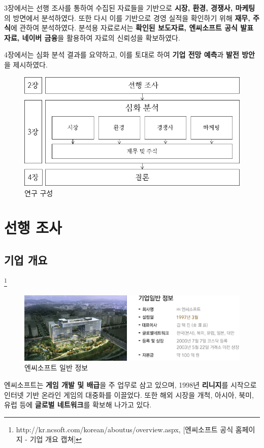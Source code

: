 \documentclass[11pt]{oblivoir}
\begin{document}
			3장에서는 선행 조사를 통하여 수집된 자료들을 기반으로 \textbf{시장, 환경, 경쟁사, 마케팅}의 방면에서 분석하였다. 또한 다시 이를 기반으로 경영 실적을 확인하기 위해 \textbf{재무, 주식}에 관하여 분석하였다. 분석용 자료로서는 \textbf{확인된 보도자료, 엔씨소프트 공식 발표 자료, 네이버 금융}을 활용하여 자료의 신뢰성을 확보하였다.
			
			4장에서는 심화 분석 결과를 요약하고, 이를 토대로 하여 \textbf{기업 전망 예측}과 \textbf{발전 방안}을 제시하였다.
			\begin{figure}[htbp]
				\centering
				\includegraphics[width=1\textwidth]{Pictures/Methods.png}
				\caption{연구 구성}
			\end{figure}
			
	
	\section{선행 조사}
		\subsection{기업 개요}
		\noindent 
		\footnote{http://kr.ncsoft.com/korean/aboutus/overview.aspx, [엔씨소프트 공식 홈페이지 - 기업 개요 캡쳐]}
		\begin{figure}[htbp]
			\centering
			\includegraphics[width=1\textwidth]{Pictures/ncinfo.png}
			\caption{엔씨소프트 일반 정보}
		\end{figure} 
		
		엔씨소프트는 \textbf{게임 개발 및 배급}을 주 업무로 삼고 있으며, 1998년 \textbf{리니지}를 시작으로 인터넷 기반 온라인 게임의 대중화를 이끌었다. 또한 해외 시장을 개척, 아시아, 북미, 유럽 등에 \textbf{글로벌 네트워크}를 확보해 나가고 있다.
		
\end{document}
